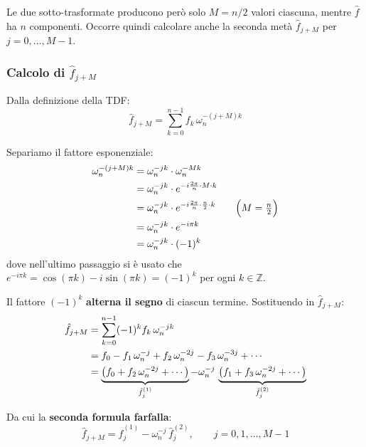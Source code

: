 \documentclass[a4paper,12pt]{article}
\theoremstyle{definition}
\theoremstyle{remark}
\begin{document}
Le due sotto-trasformate producono però solo $M = n/2$ valori ciascuna,
mentre $\hat{f}$ ha $n$ componenti. Occorre quindi calcolare anche la
seconda metà $\hat{f}_{j+M}$ per $j = 0, \ldots, M-1$.

\subsubsection{Calcolo di \texorpdfstring{$\hat{f}_{j+M}$}{f\_{j+M}}}

Dalla definizione della TDF:
\begin{equation}
  \hat{f}_{j+M} = \sum_{k=0}^{n-1} f_k\,\omega_n^{-(j+M)k}
\end{equation}

Separiamo il fattore esponenziale:
\begin{align}
  \omega_n^{-(j+M)k}
  &= \omega_n^{-jk} \cdot \omega_n^{-Mk} \notag \\
  &= \omega_n^{-jk} \cdot e^{-i\frac{2\pi}{n} \cdot M \cdot k} \notag \\
  &= \omega_n^{-jk} \cdot e^{-i\frac{2\pi}{n} \cdot \frac{n}{2} \cdot k}
     \qquad \Bigl(M = \tfrac{n}{2}\Bigr) \notag \\
  &= \omega_n^{-jk} \cdot e^{-i\pi k} \notag \\
  &= \omega_n^{-jk} \cdot (-1)^k
  \label{eq:omega-shift}
\end{align}
dove nell'ultimo passaggio si è usato che $e^{-i\pi k} = \cos(\pi k)
- i\sin(\pi k) = (-1)^k$ per ogni $k \in \mathbb{Z}$.

Il fattore $(-1)^k$ \textbf{alterna il segno} di ciascun termine.
Sostituendo in $\hat{f}_{j+M}$:
\begin{align}
  \hat{f}_{j+M}
  &= \sum_{k=0}^{n-1} (-1)^k f_k\,\omega_n^{-jk} \notag \\
  &= f_0 - f_1\,\omega_n^{-j} + f_2\,\omega_n^{-2j}
     - f_3\,\omega_n^{-3j} + \cdots \notag \\
  &= \underbrace{\bigl(f_0 + f_2\,\omega_n^{-2j} + \cdots\bigr)}_{
       \hat{f}_j^{(1)}}
     - \omega_n^{-j}\,
     \underbrace{\bigl(f_1 + f_3\,\omega_n^{-2j} + \cdots\bigr)}_{
       \hat{f}_j^{(2)}}
  \label{eq:fft-jM-derivazione}
\end{align}

Da cui la \textbf{seconda formula farfalla}:
\begin{equation}
  \boxed{
    \hat{f}_{j+M} = \hat{f}_j^{(1)} - \omega_n^{-j}\,\hat{f}_j^{(2)},
    \qquad j = 0, 1, \ldots, M-1
  }
  \label{eq:butterfly-minus}
\end{equation}
\end{document}
